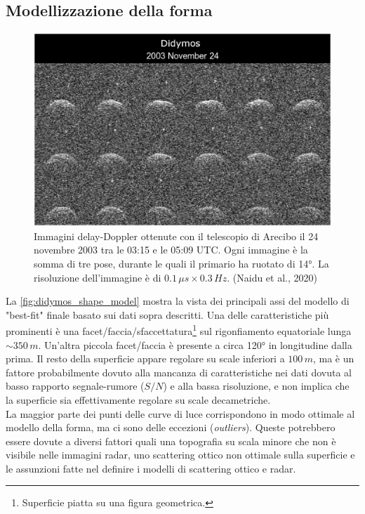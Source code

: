 \documentclass[a4paper,11pt,openright]{book}
\begin{document}
\subsection{Modellizzazione della forma}\label{sec:shape_model}

\begin{figure}[!h]
    \centering
    \includegraphics[scale=1.3]{figure/didymos_241103.jpg}
    \caption[Immagini delay-Doppler ottenute con il telescopio di Arecibo.]{Immagini delay-Doppler ottenute con il telescopio di Arecibo il 24 novembre 2003 tra le 03:15 e le 05:09 UTC. Ogni immagine è la somma di tre pose, durante le quali il primario ha ruotato di 14°. La risoluzione dell'immagine è di $0.1\,\mu s\times 0.3\,Hz$. (Naidu et al., 2020)}
    \label{fig:didymos_241103}
\end{figure}

La \cref{fig:didymos_shape_model} mostra la vista dei principali assi del modello di "best-fit" finale basato sui dati sopra descritti. Una delle caratteristiche più prominenti è una facet/faccia/sfaccettatura\footnote{Superficie piatta su una figura geometrica.} sul rigonfiamento equatoriale lunga $\sim 350\,m$. Un'altra piccola facet/faccia è presente a circa 120° in longitudine dalla prima. Il resto della superficie appare regolare su scale inferiori a $100\,m$, ma è un fattore probabilmente dovuto alla mancanza di caratteristiche nei dati dovuta al basso rapporto segnale-rumore ($S/N$) e alla bassa risoluzione, e non implica che la superficie sia effettivamente regolare su scale decametriche.\\
La maggior parte dei punti delle curve di luce corrispondono in modo ottimale al modello della forma, ma ci sono delle eccezioni (\textit{outliers}). Queste potrebbero essere dovute a diversi fattori quali una topografia su scala minore che non è visibile nelle immagini radar, uno scattering ottico non ottimale sulla superficie e le assunzioni fatte nel definire i modelli di scattering ottico e radar.
\end{document}
